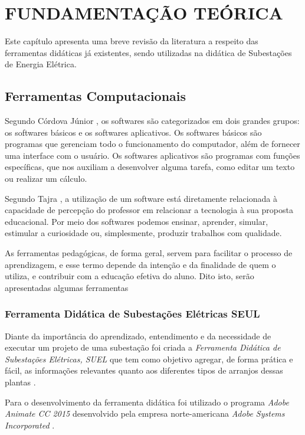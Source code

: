 \chapter{FUNDAMENTAÇÃO TEÓRICA}

Este capítulo apresenta uma breve revisão da literatura a respeito das ferramentas didáticas já existentes, sendo utilizadas na didática de Subestações de Energia Elétrica. %

\section{Ferramentas Computacionais}

Segundo Córdova Júnior \citeyearpar{cordova2018fundamentos}, os softwares são categorizados em dois grandes grupos: os softwares básicos e os softwares aplicativos. Os softwares básicos são programas que gerenciam todo o funcionamento do computador, além de fornecer uma interface com o usuário. Os softwares aplicativos são programas com funções específicas, que nos auxiliam a desenvolver alguma tarefa, como editar um texto ou realizar um cálculo.

Segundo Tajra \citeyearpar{tajra2012informatica}, a utilização de um software está diretamente relacionada à capacidade de percepção do professor em relacionar a tecnologia à sua proposta educacional. Por meio dos softwares podemos ensinar, aprender, simular, estimular a curiosidade ou, simplesmente, produzir trabalhos com qualidade.

As ferramentas pedagógicas, de forma geral, servem para facilitar o processo de aprendizagem, e esse termo depende da intenção e da finalidade de quem o utiliza, e contribuir com a educação efetiva do aluno. Dito isto, serão apresentadas algumas ferramentas 


\subsection{Ferramenta Didática de Subestações Elétricas SEUL}

Diante da importância do aprendizado, entendimento e da necessidade de
executar um projeto de uma subestação foi criada a \textit{Ferramenta Didática de Subestações Elétricas, SUEL} que tem como objetivo agregar, de forma prática e fácil, as informações relevantes quanto aos diferentes tipos de arranjos dessas plantas \cite{holanda2016suel}.

Para o desenvolvimento da ferramenta didática foi utilizado o programa \textit{Adobe Animate CC 2015} desenvolvido pela empresa norte-americana \textit{Adobe Systems Incorporated} \cite{holanda2016suel}.

